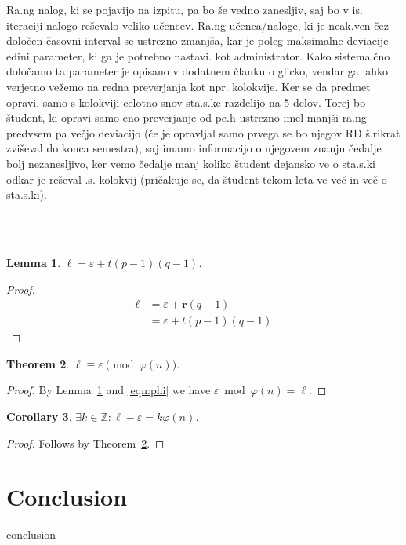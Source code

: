\documentclass{IEEEtran}
\newcommand{\B}[1]{\ensuremath{\boldsymbol{#1}}}
\newcommand{\Z}{\ensuremath{\mathbb Z}}
\newtheorem{theorem}{Theorem}[section]
\newtheorem{corollary}[theorem]{Corollary}
\newtheorem{lemma}[theorem]{Lemma}
\begin{document}
Ra.ng nalog, ki se pojavijo na izpitu, pa bo še vedno zanesljiv, saj bo v is. iteraciji nalogo reševalo veliko učencev.
Ra.ng učenca/naloge, ki je neak.ven čez določen časovni interval se ustrezno zmanjša, kar je poleg maksimalne deviacije edini parameter, ki ga je potrebno nastavi. kot administrator. Kako sistema.čno določamo ta parameter je opisano v dodatnem članku o glicko, vendar ga lahko verjetno vežemo na redna preverjanja kot npr. kolokvije. Ker se da predmet opravi. samo s kolokviji celotno snov sta.s.ke razdelijo na 5 delov. Torej bo študent, ki opravi samo eno preverjanje od pe.h ustrezno imel manjši ra.ng predvsem pa večjo deviacijo (če je opravljal samo prvega se bo njegov RD š.rikrat zviševal do konca semestra), saj imamo informacijo o njegovem znanju čedalje bolj nezanesljivo, ker vemo čedalje manj koliko študent dejansko ve o sta.s.ki odkar je reševal .s. kolokvij (pričakuje se, da študent tekom leta ve več in več o sta.s.ki).


\hfill
\\
\\
\begin{lemma} \label{lem:eps}
$\ell = \varepsilon + t(p-1)(q-1)$.
\end{lemma}

\begin{proof}
\begin{align*}
\ell &= \varepsilon + \B{r}(q-1) \\
&= \varepsilon + t(p-1)(q-1)
\end{align*}
\end{proof}

\begin{theorem} \label{thm:equiv}
$\ell \equiv \varepsilon \pmod{\varphi(n)}$.
\end{theorem}

\begin{proof}
By Lemma~\ref{lem:eps} and \eqref{eqn:phi} we have $\varepsilon \bmod{\varphi(n)} = \ell$.
\end{proof}

\begin{corollary} \label{cor:mult}
$\exists k \in \Z: \ell - \varepsilon = k \varphi(n)$.
\end{corollary}

\begin{proof}
Follows by Theorem~\ref{thm:equiv}.
\end{proof}

\section{Conclusion}
\label{sec:cnc}
conclusion



\end{document}
